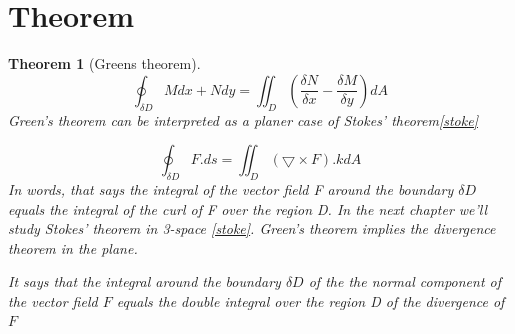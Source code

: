 \documentclass[10pt,a4paper]{article}
\newtheorem{theorem}{Theorem}[section]
\begin{document}
\section{Theorem}
 \begin{theorem}[Greens theorem]
 $$\oint_{\delta D}M {dx}+ N {dy}=\iint_{D}\left(\frac{\delta N}{\delta x}-\frac{\delta M}{\delta y}\right) dA$$\label{Green}
 Green’s theorem can be interpreted as a planer
 case of Stokes’ theorem\ref{stoke} \cite{cite2}
 
 $$\oint_{\delta D}{F.}ds=\iint_D\left(\bigtriangledown\times F\right). {k} dA$$\label{stoke}
 In words, that says the integral of the vector field
 F around the boundary $\delta D$ equals the integral of
 the curl of F over the region D. In the next chapter
 we’ll study Stokes’ theorem in 3-space \ref{stoke}.
 Green’s theorem implies the divergence theorem in the plane.
 
It says that the integral around the boundary $\delta D$ of the the normal component of the vector field $F$ equals the double integral over the region D of the divergence of ${F}$ 
\end{theorem}
\end{document}
